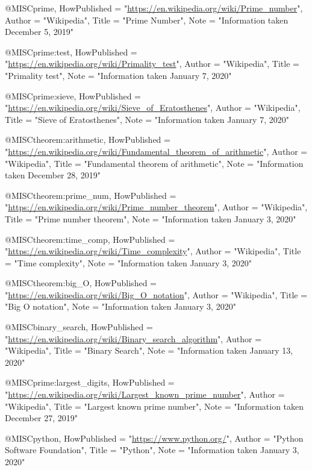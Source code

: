 @MISC{prime,
	HowPublished = "\url{https://en.wikipedia.org/wiki/Prime_number}",
	Author = "Wikipedia",
	Title = "Prime Number",
	Note = "Information taken December 5, 2019"
}

@MISC{prime:test,
	HowPublished = "\url{https://en.wikipedia.org/wiki/Primality_test}",
	Author = "Wikipedia",
	Title = "Primality test",
	Note = "Information taken January 7, 2020"
}

@MISC{prime:sieve,
	HowPublished = "\url{https://en.wikipedia.org/wiki/Sieve_of_Eratosthenes}",
	Author = "Wikipedia",
	Title = "Sieve of Eratosthenes",
	Note = "Information taken January 7, 2020"
}

@MISC{theorem:arithmetic,
	HowPublished = "\url{https://en.wikipedia.org/wiki/Fundamental_theorem_of_arithmetic}",
	Author = "Wikipedia",
	Title = "Fundamental theorem of arithmetic",
	Note = "Information taken December 28, 2019"
}

@MISC{theorem:prime_num,
	HowPublished = "\url{https://en.wikipedia.org/wiki/Prime_number_theorem}",
	Author = "Wikipedia",
	Title = "Prime number theorem",
	Note = "Information taken January 3, 2020"
}

@MISC{theorem:time_comp,
	HowPublished = "\url{https://en.wikipedia.org/wiki/Time_complexity}",
	Author = "Wikipedia",
	Title = "Time complexity",
	Note = "Information taken January 3, 2020"
}

@MISC{theorem:big_O,
	HowPublished = "\url{https://en.wikipedia.org/wiki/Big_O_notation}",
	Author = "Wikipedia",
	Title = "Big O notation",
	Note = "Information taken January 3, 2020"
}

@MISC{binary_search,
	HowPublished = "\url{https://en.wikipedia.org/wiki/Binary_search_algorithm}",
	Author = "Wikipedia",
	Title = "Binary Search",
	Note = "Information taken January 13, 2020"
}

@MISC{prime:largest_digits,
	HowPublished = "\url{https://en.wikipedia.org/wiki/Largest_known_prime_number}",
	Author = "Wikipedia",
	Title = "Largest known prime number",
	Note = "Information taken December 27, 2019"
}

@MISC{python,
	HowPublished = "\url{https://www.python.org/}",
	Author = "Python Software Foundation",
	Title = "Python",
	Note = "Information taken January 3, 2020"
}
